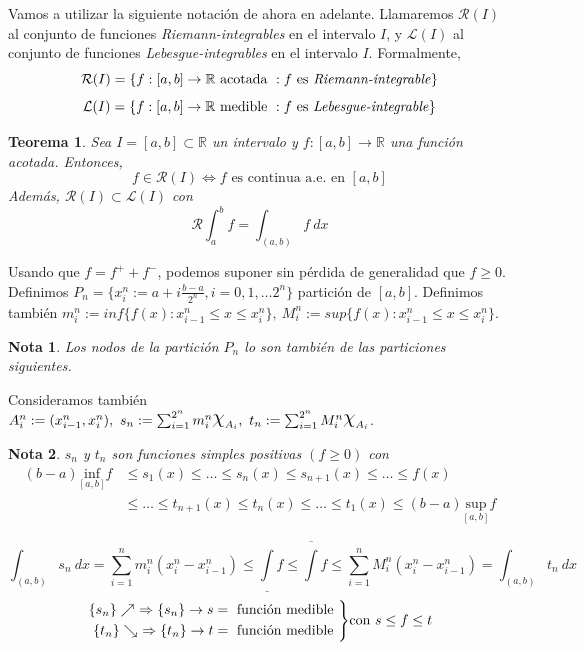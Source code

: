 \documentclass[11pt, a4paper]{article}
\makeatletter
\newif\IfInSansMode
\let\oldsf\sffamily
\renewcommand*{\sffamily}{\oldsf\mathversion{sans}\InSansModetrue}
\let\oldnorm\normalfont
\renewcommand*{\normalfont}{\oldnorm\InSansModefalse\mathversion{normal}}
\newcommand{\R}{\mathbb{R}} \newcommand{\N}{\mathbb{N}}
\DeclareRobustCommand{\rchi}{{\Large \mathpalette\irchi\relax}}
\newcommand{\irchi}[2]{\raisebox{0.4\depth}{$#1\chi$}} %
\renewenvironment{proof}[1][\proofname] {\par\pushQED{\qed}\normalfont\topsep6\p@\@plus6\p@\relax\trivlist\item[\hskip\labelsep\itshape\sffamily#1\@addpunct{.}]\ignorespaces}{\popQED\endtrivlist\@endpefalse}
\theoremstyle{theorem-style}
\newtheorem{nth}{Teorema}[section]
\theoremstyle{definition-style}
\theoremstyle{remark-style}
\newtheorem*{nota}{Nota}
\theoremstyle{example-style}
\newenvironment{rcases}
{\left.\begin{aligned}}
    {\end{aligned}\right\rbrace}
\makeatother
\begin{document}
Vamos a utilizar la siguiente notación de ahora en adelante. Llamaremos $\mathcal R(I)$ al conjunto de funciones \textit{Riemann-integrables} en el intervalo $I$, y $\mathcal L(I)$ al conjunto de funciones \textit{Lebesgue-integrables} en el intervalo $I$. Formalmente,
$$\mathcal R(I) = \{ f : [a, b] \rightarrow \R \text{ acotada } : f \text{ es \textit{Riemann-integrable}} \}$$
$$\mathcal L(I) = \{ f : [a, b] \rightarrow \R \text{ medible } : f \text{ es \textit{Lebesgue-integrable}} \}$$

\begin{nth}
    Sea $I = [a, b] \subset \R$ un intervalo y $f : [a, b] \rightarrow \R$ una función acotada. Entonces, 
    $$f \in \mathcal R(I) \Leftrightarrow f \text{ es continua a.e. en } [a, b]$$
    Además, $\mathcal R(I) \subset \mathcal L (I)$ con 
    $$ \mathcal R \int_a^b f = \int_{(a,b)} f \ dx $$
\end{nth}

\begin{proof}
    Usando que $f = f^{+} + f^{-}$, podemos suponer sin pérdida de generalidad que $f \geq 0$. Definimos $P_n = \{ x^n_i := a + i\frac{b-a}{2^n}, i= 0,1, \hdots 2^n \}$ partición de $[a, b]$. Definimos también $m_i^n := inf \{ f(x) : x^n_{i-1} \leq x \leq x_i^n \}, \ M^n_i := sup \{ f(x) : x^n_{i-1} \leq x \leq x^n_i \}$.

    \begin{nota}
        Los nodos de la partición $P_n$ lo son también de las particiones siguientes.
    \end{nota}

    Consideramos también $A^n_i := (x^n_{i-1}, x^n_i), \ s_n := \sum^{2^n}_{i=1} m^n_i \rchi_{A_{i}}, \ t_n := \sum^{2^n}_{i=1} M^n_i \rchi_{A_{i}}$.

    \begin{nota}
        $s_n$ y $t_n$ son funciones simples positivas $(f \geq 0)$ con 
        \begin{align*}
            \label{}
            (b - a) \underset{[a,b]}{\text{inf}} f &\leq s_1(x) \leq \hdots \leq s_n(x) \leq s_{n+1}(x) \leq \hdots \leq f(x) \\
                                                   & \leq \hdots \leq t_{n+1}(x) \leq t_n(x) \leq \hdots \leq t_1(x) \leq (b-a) \underset{[a,b]}{\text{sup}} f
        \end{align*}

        $$\int_{(a,b)} s_n \ dx = \sum^{n}_{i=1} m_i^n(x_i^n - x^n_{i-1}) \leq \underline{\int} f \leq \overline{\int}f \leq \sum^{n}_{i=1} M^n_i (x_i^n - x^n_{i-1}) = \int_{(a,b)} t_n \ dx$$
        $$
        \begin{rcases}
            \{s_n\} \nearrow \ \Rightarrow \{s_n\} \rightarrow s = \text{ función medible } \\
            \{t_n\} \searrow \ \Rightarrow \{t_n\} \rightarrow t = \text{ función medible }
        \end{rcases} \text{con } s \leq f \leq t$$
    \end{nota}
\end{proof}
\end{document}
